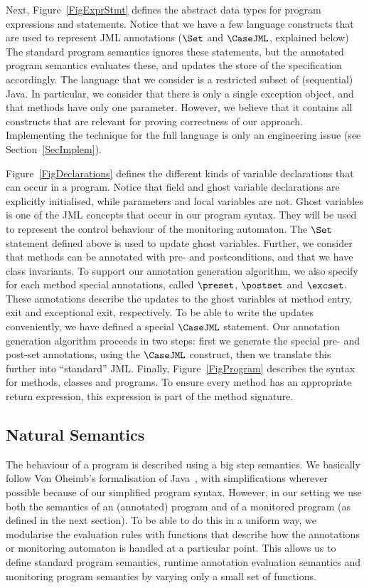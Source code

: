 Next, Figure~\ref{FigExprStmt} defines the abstract data types for
program expressions and statements. Notice that we have a few language
constructs that are used to represent JML annotations (\(\Set\) and
\(\CaseJML\), explained below) The standard program semantics ignores 
these statements, but the annotated program semantics evaluates these,
and updates the store of the specification accordingly. The language
that we consider is a restricted subset of (sequential) Java. In
particular, we consider that there is only a single exception object,
and that methods have only one parameter. However, we believe that it
contains all constructs that are relevant for proving correctness of
our approach. Implementing the technique for the full language is only
an engineering issue (see Section~\ref{SecImplem}).

Figure~\ref{FigDeclarations} defines the different kinds of variable
declarations that can occur in a program. Notice that field and ghost
variable declarations are explicitly initialised, while parameters and
local variables are not. Ghost variables is one of the JML concepts
that occur in our program syntax. They will be used to represent the
control behaviour of the monitoring automaton. The \(\Set\) statement
defined above is used to update ghost variables. Further, we consider
that methods can be annotated with pre- and postconditions, and that
we have class invariants. To support our annotation generation
algorithm, we also specify for each method special annotations, called
\(\preset\),
\(\postset\) and \(\excset\). These annotations describe the updates
to the ghost variables at method entry, exit and exceptional exit,
respectively. To be able to write the updates conveniently, we have
defined a special \(\CaseJML\) statement. Our annotation generation
algorithm proceeds in two steps: first we generate the special pre-
and post-set annotations, using the \(\CaseJML\) construct, then we
translate this further into ``standard'' JML. Finally,
Figure~\ref{FigProgram} describes the syntax for methods, classes and
programs. To ensure every method has an appropriate return expression,
this expression is part of the method signature.

\subsection{Natural Semantics}\label{SecSemantics}
The behaviour of a program is described using a big step semantics. We
basically follow Von Oheimb's formalisation of Java~\cite{vOheimb?},
with simplifications wherever possible because of our simplified
program syntax. However, in our setting we use both the semantics of
an (annotated) program and of a monitored program (as defined in the
next section). To be able to do this in a uniform way, we modularise
the evaluation rules with functions that describe how the annotations
or monitoring automaton is handled at a particular point. This allows
us to define standard program semantics, runtime annotation evaluation
semantics and monitoring program semantics by varying only a small set
of functions.

